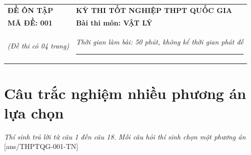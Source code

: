\begin{tabular}{M{7cm}M{10.5cm}}
	\textbf{ĐỀ ÔN TẬP}& \textbf{KỲ THI TỐT NGHIỆP THPT QUỐC GIA}\\
	\textbf{MÃ ĐỀ: 001}& \textbf{Bài thi môn: VẬT LÝ}\\
	\textit{(Đề thi có 04 trang)}& \textit{Thời gian làm bài: 50 phút, không kể thời gian phát đề}
	
	\noindent\rule{4cm}{0.8pt} \\
\end{tabular}
\setcounter{section}{0}
\section{Câu trắc nghiệm nhiều phương án lựa chọn}
\textit{Thí sinh trả lời từ câu 1 đến câu 18. Mỗi câu hỏi thí sinh chọn một phương án}
\setcounter{ex}{0}
[ans/THPTQG-001-TN]

